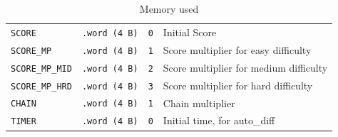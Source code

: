 \documentclass{article}
\begin{document}
\begin{table}[h]
\begin{tabular}{|l|l|l|p{6cm}|}
\texttt{SCORE}   & \texttt{.word (4 B)}& \texttt{0} & Initial Score \\
\texttt{SCORE\_MP}   & \texttt{.word (4 B)}& \texttt{1} & Score multiplier for easy difficulty \\
\texttt{SCORE\_MP\_MID}   & \texttt{.word (4 B)}& \texttt{2} & Score multiplier for medium difficulty \\
\texttt{SCORE\_MP\_HRD}   & \texttt{.word (4 B)}& \texttt{3} & Score multiplier for hard difficulty \\
\texttt{CHAIN}   & \texttt{.word (4 B)}& \texttt{1} & Chain multiplier\\
\texttt{TIMER}   & \texttt{.word (4 B)}& \texttt{0} & Initial time, for auto\_diff \\

\hline
\end{tabular}
\caption{Memory used}
\label{tab:data-layout}
\end{table}

    
\end{document}

